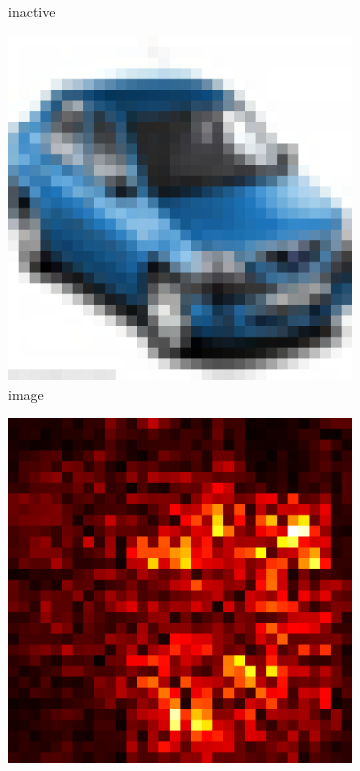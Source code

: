 \documentclass[preprint,12pt]{elsarticle}
\begin{document}
\begin{figure}
\begin{subfigure}{0.14\textwidth}
        \caption{inactive}
    \end{subfigure}
    \begin{subfigure}{0.14\linewidth}
        \centering
        \includegraphics[width=\linewidth]{../visualizations/examples/cifar10/cnn/images/1.png}
        \caption{image}
    \end{subfigure}
    \hfill
    \begin{subfigure}{0.14\linewidth}
        \centering
        \includegraphics[width=\linewidth]{../visualizations/examples/cifar10/cnn/saliency_map/1.png}

\end{subfigure}
\end{figure}
\end{document}
